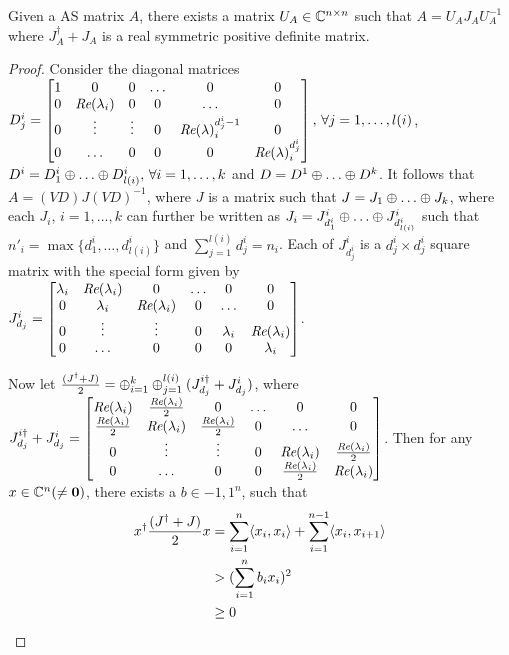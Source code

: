 \begin{lemma}
Given a AS matrix $A$, there exists a matrix $U_A\in \mathbb{C}^{n\times n}$ such that $A=U_AJ_A U_A^{-1}$ where $J_A^\dag+J_A$ is a real symmetric positive definite matrix.
\end{lemma}
\begin{proof}
Consider the diagonal matrices $D^i_j=\begin{bmatrix} 1  &0 &0 &\ldots &0 &0\\ 0 &\emph{Re}(\lambda_i) &0 &0 &\ldots &0 \\ 0 &\vdots &\vdots &0 &\emph{Re}(\lambda)^{d^i_j-1}_i &0 \\ 0 &\ldots &0 &0 &0 &\emph{Re}(\lambda)^{d^i_j}_i \end{bmatrix},\,\forall j=1,\ldots,l(i)$, $D^i=D^i_1 \oplus\ldots\oplus D^i_{l(i)},\,\forall i=1,\ldots,k$ and $D=D^1 \oplus\ldots\oplus D^k$.
It follows that $A=(VD) J (VD)^{-1}$, where $J$ is a matrix such that
$J=J_1 \oplus \ldots \oplus J_k$, where each $J_i,\,i=1,\ldots,k$ can further be written as
$J_i=J^i_{d^i_1} \oplus \ldots \oplus J^i_{d^i_{l(i)}}$ such that  $n'_i=\max\{d^i_1,\ldots, d^i_{l(i)} \}$ and $\sum_{j=1}^{l(i)} d^i_j =n_i$. Each of $J^i_{d^i_j}$ is a $d^i_j\times d^i_j$ square matrix with the special form given by
$J^i_{d_j}=\begin{bmatrix} \lambda_i &\emph{Re}(\lambda_i) &0 &\ldots &0 &0\\ 0 &\lambda_i &\emph{Re}(\lambda_i) &0 &\ldots &0 \\ 0 &\vdots &\vdots &0 &\lambda_i &\emph{Re}(\lambda_i) \\ 0 &\ldots &0 &0 &0 &\lambda_i \end{bmatrix}$.

Now let $\frac{(J^\dag+J)}{2}=\oplus_{i=1}^k \oplus_{j=1}^{l(i)}(J^{i\dag}_{d_j}+J^i_{d_j})$, where $J^{i\dag}_{d_j}+J^i_{d_j}=\begin{bmatrix} \emph{Re}(\lambda_i) &\frac{\emph{Re}(\lambda_i)}{2} &0 &\ldots &0 &0\\ \frac{\emph{Re}(\lambda_i)}{2} &\emph{Re}(\lambda_i) &\frac{\emph{Re}(\lambda_i)}{2} &0 &\ldots &0 \\ 0 &\vdots &\vdots &0 &\emph{Re}(\lambda_i) &\frac{\emph{Re}(\lambda_i)}{2} \\ 0 &\ldots &0 &0 &\frac{\emph{Re}(\lambda_i)}{2} &\emph{Re}(\lambda_i) \end{bmatrix} $. Then for any $x\in \mathbb{C}^n (\neq \mathbf{0})$, there exists a $b\in {-1,1}^n$, such that
\begin{align*}
x^\dag \frac{(J^\dag+J)}{2} x &=\sum_{i=1}^n \langle x_i,x_i\rangle+\sum_{i=1}^{n-1}\langle x_i,x_{i+1}\rangle\\
&> (\sum_{i=1}^n b_i x_i)^2\\
&\geq 0
\end{align*}
\end{proof}

